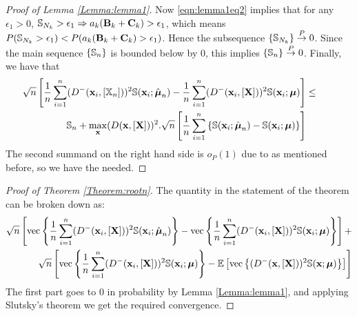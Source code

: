 \begin{proof}[Proof of Lemma \ref{Lemma:lemma1}]
Now \ref{eqn:lemma1eq2} implies that for any $\epsilon_1 > 0$, ${\mathbb{S}}_{N_k} > \epsilon_1 \Rightarrow a_k ({\mathbf{B}}_k + {\mathbf{C}}_k) > \epsilon_1$, which means $ P({\mathbb{S}}_{N_k} > \epsilon_1) < P(a_k ({\mathbf{B}}_k + {\mathbf{C}}_k) > \epsilon_1)$. Hence the subsequence $\{{\mathbb{S}}_{N_k}\} \stackrel{P}{\rightarrow} 0$. Since the main sequence $\{{\mathbb{S}}_n\}$ is bounded below by 0, this implies $\{{\mathbb{S}}_n\} \stackrel{P}{\rightarrow} 0$. Finally, we have that
%
\begin{eqnarray}
\sqrt n \left[
\frac{1}{n} \sum_{i=1}^n ( D^- ({\bf{x}}_i, [ {\mathbb{X}}_n]) )^2 {\mathbb{S}}( {\bf{x}}_i; \hat{{\boldsymbol{\mu}}}_n) -
\frac{1}{n} \sum_{i=1}^n ( D^- ({\bf{x}}_i, [{\mathbf{X}}]) )^2 {\mathbb{S}}( {\bf{x}}_i; {\boldsymbol{\mu}}) \right] &\leq & \hspace{1em} \notag\\
{\mathbb{S}}_n +  \max_{\bf{x}} (D ( {\bf{x}}, [{\mathbf{X}}]))^2 . \sqrt{n} \left[ \frac{1}{n} \sum_{i=1}^{n} \left\{ {\mathbb{S}}( {\bf{x}}_i; \hat{{\boldsymbol{\mu}}}_{n}) - {\mathbb{S}}( {\bf{x}}_i; {\boldsymbol{\mu}}) \right\} \right] &&
\end{eqnarray}
%
The second summand on the right hand side is $o_P(1)$ due to \cite{durre14} as mentioned before, so we have the needed.
\end{proof}

\begin{proof}[Proof of Theorem \ref{Theorem:rootn}]
The quantity in the statement of the theorem can be broken down as:
%
\begin{eqnarray*}
\sqrt n \left[ \operatorname*{vec} \left\{ \frac{1}{n} \sum_{i=1}^n ( D^- ({\bf{x}}_i, [{\mathbf{X}}]))^2 {\mathbb{S}}({\bf{x}}_i; \hat{{\boldsymbol{\mu}}}_n) \right\} - \operatorname*{vec} \left\{ \frac{1}{n} \sum_{i=1}^n ( D^- ({\bf{x}}_i, [{\mathbf{X}}] ) )^2 {\mathbb{S}}( {\bf{x}}_i; {\boldsymbol{\mu}}) \right\} \right] +\\
\sqrt n \left[ \operatorname*{vec} \left\{ \frac{1}{n} \sum_{i=1}^n ( D^- ({\bf{x}}_i, [{\mathbf{X}}] ) )^2 {\mathbb{S}}( {\bf{x}}_i; {\boldsymbol{\mu}}) \right\} - {\mathbb{E}} \left[ \operatorname*{vec} \left\{ ( D^- ({\bf{x}}, [{\mathbf{X}}] ) )^2 {\mathbb{S}} ({\bf{x}}; {\boldsymbol{\mu}}) \right \} \right] \right]
\end{eqnarray*}
%
The first part goes to 0 in probability by Lemma \ref{Lemma:lemma1}, and applying Slutsky's theorem we get the required convergence.
\end{proof}

